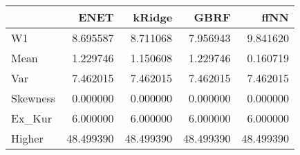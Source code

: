 \begin{tabular}{lrrrr}
\toprule
{} &       ENET &     kRidge &       GBRF &       ffNN \\
\midrule
W1       &   8.695587 &   8.711068 &   7.956943 &   9.841620 \\
Mean     &   1.229746 &   1.150608 &   1.229746 &   0.160719 \\
Var      &   7.462015 &   7.462015 &   7.462015 &   7.462015 \\
Skewness &   0.000000 &   0.000000 &   0.000000 &   0.000000 \\
Ex\_Kur   &   6.000000 &   6.000000 &   6.000000 &   6.000000 \\
Higher   &  48.499390 &  48.499390 &  48.499390 &  48.499390 \\
\bottomrule
\end{tabular}
